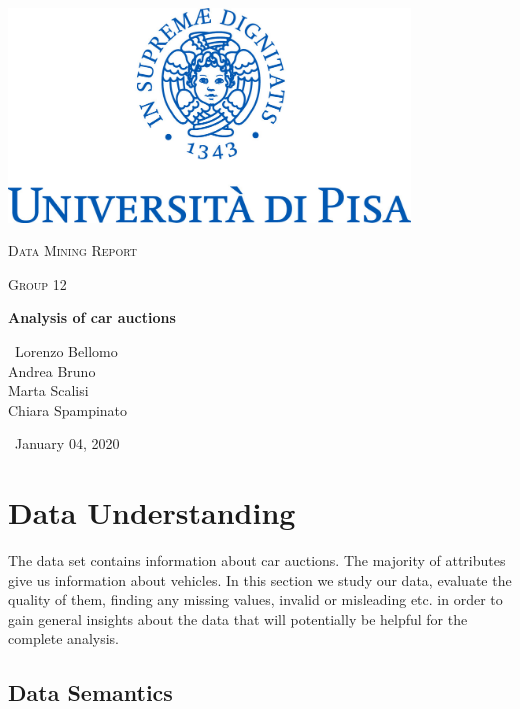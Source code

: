 \documentclass{article}
\begin{document}
\begin{titlepage}
	\centering
	\includegraphics[width=0.80\textwidth]{marchio.jpg}\par\vspace{2cm}
	{\scshape\LARGE Data Mining Report \par}
	\vspace{1cm}
	{\scshape\Large Group 12 \\ \par}
	\vspace{1cm}
	{\huge\bfseries Analysis of car auctions\par}
	\vspace{2cm}
	{\Large\ Lorenzo Bellomo \\ Andrea Bruno \\ Marta Scalisi \\ Chiara Spampinato\par}
	\vspace{4cm}
    {\Large\ January 04, 2020\par}
	\end{titlepage}
	

	

\section{Data Understanding}
The data set contains information about car auctions. The majority of attributes give us information about vehicles. 
In this section we study our data, evaluate the quality of them, finding any missing values, invalid or misleading etc. in order to gain general insights about the data that will potentially be helpful for the complete analysis.

\subsection{Data Semantics}
\end{document}
